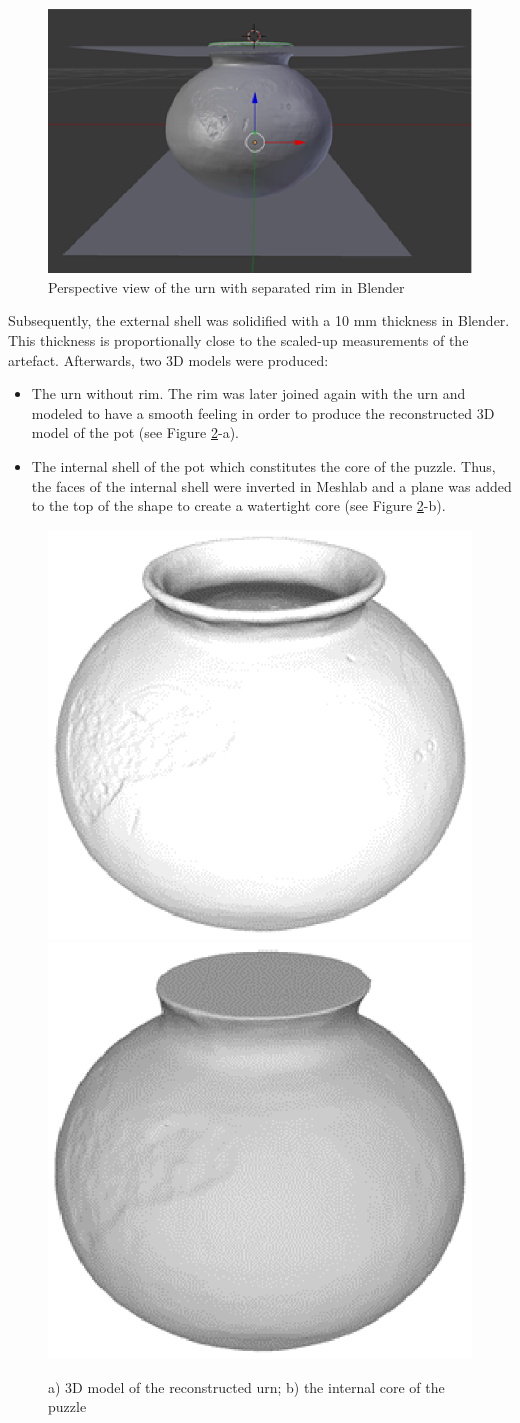 \documentclass[acmlarge,screen]{acmart}
\begin{document}
\begin{figure}[h]
  \centering
  \includegraphics[width=0.6\linewidth]{images/blender2}
  \caption{\label{fig:blender}
    Perspective view of the urn with separated rim in Blender}
\end{figure}

Subsequently, the external shell was solidified with a 10 mm thickness in Blender. This thickness is proportionally close to the scaled-up measurements of the artefact. Afterwards, two 3D models were produced:
\begin{itemize}
\item The urn without rim. The rim was later joined again with the urn and modeled to have a smooth feeling in order to produce the reconstructed 3D model of the pot (see Figure \ref{fig:reconstruction}-a).
\item The internal shell of the pot which constitutes the core of the puzzle. Thus, the faces of the internal shell were inverted in Meshlab and a plane was added to the top of the shape to create a watertight core (see Figure \ref{fig:reconstruction}-b).
\end{itemize}

\begin{figure}[h]
  \centering
  \includegraphics[width=0.45\linewidth]{images/3Dreconstruction}
  \includegraphics[width=0.45\linewidth]{images/core}
  \caption{\label{fig:reconstruction}
    a) 3D model of the reconstructed urn; b) the internal core of the puzzle}
\end{figure}
\end{document}
